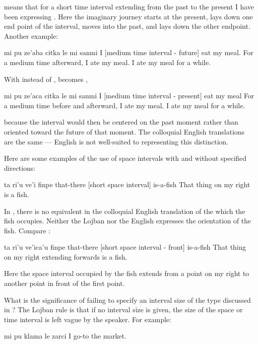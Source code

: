 {\noindent}means that for a short time interval extending from the past to
    the present I have been expressing . Here the imaginary journey starts at the present, lays
    down one end point of the interval, moves into the past, and
    lays down the other endpoint. Another example:
\begin{example}
mi pu ze'aba citka le mi sanmi\n
I  [medium time interval - future] eat my meal.\n
For a medium time afterward, I ate my meal.\n
I ate my meal for a while.
\end{example}

With  instead of ,  becomes ,
\begin{example}
mi pu ze'aca citka le mi sanmi\n
I  [medium time interval - present] eat my meal\n
For a medium time before and afterward, I ate my meal.\n
I ate my meal for a while.
\end{example}

{\noindent}because the interval would then be centered on the past moment
    rather than oriented toward the future of that moment. The
    colloquial English translations are the same --- English is not
    well-suited to representing this distinction. 

Here are some examples of the use of space intervals with
    and without specified directions:
\begin{example}
ta ri'u ve'i finpe\n
that-there  [short space interval] is-a-fish\n
That thing on my right is a fish.
\end{example}

In , there is no equivalent
    in the colloquial English translation of the 
    which the fish occupies. Neither the Lojban nor the English
    expresses the orientation of the fish. Compare :
\begin{example}
ta ri'u ve'ica'u\n
\T	finpe\n
that-there  [short space interval - front]\n
\T	is-a-fish\n
That thing on my right extending forwards is a fish.
\end{example}

Here the space interval occupied by the fish extends from a
    point on my right to another point in front of the first
    point.



What is the significance of failing to specify an interval
    size of the type discussed in ? The
    Lojban rule is that if no interval size is given, the size of
    the space or time interval is left vague by the speaker. For
    example:
\begin{example}
mi pu klama le zarci\n
I  go-to the market.
\end{example}


